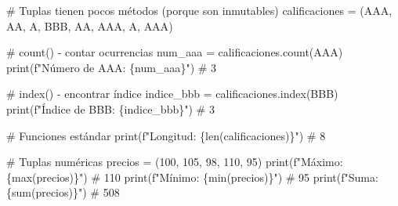 \documentclass[
  doc,
  floatsintext,
  longtable,
  a4paper,
  nolmodern,
  notxfonts,
  notimes,
  12pt,
  colorlinks=true,linkcolor=blue,citecolor=blue,urlcolor=blue]{apa7}
\newenvironment{Shaded}{\begin{snugshade}}{\end{snugshade}}
\newcommand{\BuiltInTok}[1]{\textcolor[rgb]{0.00,0.23,0.31}{#1}}
\newcommand{\CommentTok}[1]{\textcolor[rgb]{0.37,0.37,0.37}{#1}}
\newcommand{\DecValTok}[1]{\textcolor[rgb]{0.68,0.00,0.00}{#1}}
\newcommand{\NormalTok}[1]{\textcolor[rgb]{0.00,0.23,0.31}{#1}}
\newcommand{\OperatorTok}[1]{\textcolor[rgb]{0.37,0.37,0.37}{#1}}
\newcommand{\SpecialCharTok}[1]{\textcolor[rgb]{0.37,0.37,0.37}{#1}}
\newcommand{\SpecialStringTok}[1]{\textcolor[rgb]{0.13,0.47,0.30}{#1}}
\newcommand{\StringTok}[1]{\textcolor[rgb]{0.13,0.47,0.30}{#1}}
\begin{document}
\begin{Shaded}
\begin{Highlighting}[]
\CommentTok{\# Tuplas tienen pocos métodos (porque son inmutables)}
\NormalTok{calificaciones }\OperatorTok{=}\NormalTok{ (}\StringTok{\textquotesingle{}AAA\textquotesingle{}}\NormalTok{, }\StringTok{\textquotesingle{}AA\textquotesingle{}}\NormalTok{, }\StringTok{\textquotesingle{}A\textquotesingle{}}\NormalTok{, }\StringTok{\textquotesingle{}BBB\textquotesingle{}}\NormalTok{, }\StringTok{\textquotesingle{}AA\textquotesingle{}}\NormalTok{, }\StringTok{\textquotesingle{}AAA\textquotesingle{}}\NormalTok{, }\StringTok{\textquotesingle{}A\textquotesingle{}}\NormalTok{, }\StringTok{\textquotesingle{}AAA\textquotesingle{}}\NormalTok{)}

\CommentTok{\# count() {-} contar ocurrencias}
\NormalTok{num\_aaa }\OperatorTok{=}\NormalTok{ calificaciones.count(}\StringTok{\textquotesingle{}AAA\textquotesingle{}}\NormalTok{)}
\BuiltInTok{print}\NormalTok{(}\SpecialStringTok{f"Número de AAA: }\SpecialCharTok{\{}\NormalTok{num\_aaa}\SpecialCharTok{\}}\SpecialStringTok{"}\NormalTok{)  }\CommentTok{\# 3}

\CommentTok{\# index() {-} encontrar índice}
\NormalTok{indice\_bbb }\OperatorTok{=}\NormalTok{ calificaciones.index(}\StringTok{\textquotesingle{}BBB\textquotesingle{}}\NormalTok{)}
\BuiltInTok{print}\NormalTok{(}\SpecialStringTok{f"Índice de BBB: }\SpecialCharTok{\{}\NormalTok{indice\_bbb}\SpecialCharTok{\}}\SpecialStringTok{"}\NormalTok{)  }\CommentTok{\# 3}

\CommentTok{\# Funciones estándar}
\BuiltInTok{print}\NormalTok{(}\SpecialStringTok{f"Longitud: }\SpecialCharTok{\{}\BuiltInTok{len}\NormalTok{(calificaciones)}\SpecialCharTok{\}}\SpecialStringTok{"}\NormalTok{)  }\CommentTok{\# 8}

\CommentTok{\# Tuplas numéricas}
\NormalTok{precios }\OperatorTok{=}\NormalTok{ (}\DecValTok{100}\NormalTok{, }\DecValTok{105}\NormalTok{, }\DecValTok{98}\NormalTok{, }\DecValTok{110}\NormalTok{, }\DecValTok{95}\NormalTok{)}
\BuiltInTok{print}\NormalTok{(}\SpecialStringTok{f"Máximo: }\SpecialCharTok{\{}\BuiltInTok{max}\NormalTok{(precios)}\SpecialCharTok{\}}\SpecialStringTok{"}\NormalTok{)   }\CommentTok{\# 110}
\BuiltInTok{print}\NormalTok{(}\SpecialStringTok{f"Mínimo: }\SpecialCharTok{\{}\BuiltInTok{min}\NormalTok{(precios)}\SpecialCharTok{\}}\SpecialStringTok{"}\NormalTok{)   }\CommentTok{\# 95}
\BuiltInTok{print}\NormalTok{(}\SpecialStringTok{f"Suma: }\SpecialCharTok{\{}\BuiltInTok{sum}\NormalTok{(precios)}\SpecialCharTok{\}}\SpecialStringTok{"}\NormalTok{)     }\CommentTok{\# 508}
\end{Highlighting}
\end{Shaded}
\end{document}
